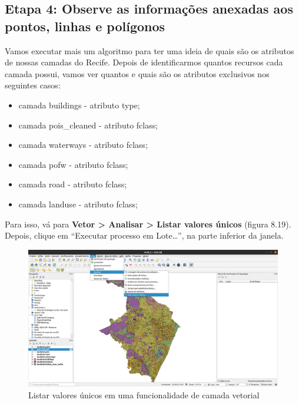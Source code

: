 \documentclass[
]{krantz}
\providecommand{\tightlist}{%
  \setlength{\itemsep}{0pt}\setlength{\parskip}{0pt}}
\begin{document}
\hypertarget{etapa-4-observe-as-informauxe7uxf5es-anexadas-aos-pontos-linhas-e-poluxedgonos}{%
\subsection{Etapa 4: Observe as informações anexadas aos pontos, linhas e polígonos}\label{etapa-4-observe-as-informauxe7uxf5es-anexadas-aos-pontos-linhas-e-poluxedgonos}}

Vamos executar mais um algoritmo para ter uma ideia de quais são os atributos de nossas camadas do Recife. Depois de identificarmos quantos recursos cada camada possui, vamos ver quantos e quais são os atributos exclusivos nos seguintes casos:

\begin{itemize}
\tightlist
\item
  camada buildings - atributo type;
\item
  camada pois\_cleaned - atributo fclass;
\item
  camada waterways - atributo fclass;
\item
  camada pofw - atributo fclass;
\item
  camada road - atributo fclass;
\item
  camada landuse - atributo fclass;
\end{itemize}

Para isso, vá para \textbf{Vetor \textgreater{} Analisar \textgreater{} Listar valores únicos} (figura 8.19). Depois, clique em ``Executar processo em Lote\ldots{}'', na parte inferior da janela.

\begin{figure}
\centering
\includegraphics{media/modulo8/fig819_a.png}
\caption{Listar valores únicos em uma funcionalidade de camada vetorial}
\end{figure}
\end{document}
